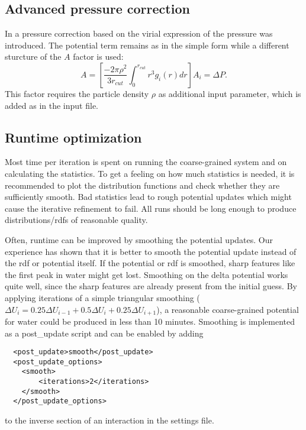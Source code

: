 \subsection{Advanced pressure correction}
In \cite{Wang:2009} a pressure correction based on the virial expression of the pressure was introduced. The potential term remains as in the simple form while a different sturcture of the $A$ factor is used:
\begin{equation}
  A = \left[\frac{-2\pi\rho^{2}}{3r_{cut}}\int_{0}^{r_{cut}}r^{3}g_{i}(r)dr\right]A_{i}=\Delta P.
\end{equation}
This factor requires the particle density $ \rho $ as additional input parameter, which is added as   in the input file.

\subsection{Runtime optimization}
\label{ref:ibi:optimize}
Most time per iteration is spent on running the coarse-grained system and on calculating the statistics. To get a feeling on how much statistics is needed, it is recommended to plot the distribution functions and check whether they are sufficiently smooth. Bad statistics lead to rough potential updates which might cause the iterative refinement to fail. All runs should be long enough to produce distributions/rdfs of reasonable quality.

Often, runtime can be improved by smoothing the potential updates. Our experience has shown that it is better to smooth the potential update instead of the rdf or potential itself. If the potential or rdf is smoothed, sharp features like the first peak in \spce water might get lost. Smoothing on the delta potential works quite well, since the sharp features are already present from the initial guess. By applying iterations of a simple triangular smoothing ($ \Delta U_i = 0.25 \Delta U_{i-1} + 0.5\Delta U_i + 0.25\Delta U_{i+1} $), a reasonable coarse-grained potential for \spce water could be produced in less than 10 minutes. Smoothing is implemented as a post\_update script and can be enabled by adding
\begin{lstlisting}
  <post_update>smooth</post_update>
  <post_update_options>
    <smooth>
        <iterations>2</iterations>
    </smooth>
  </post_update_options>
\end{lstlisting}
to the inverse section of an interaction in the settings \xml file.


